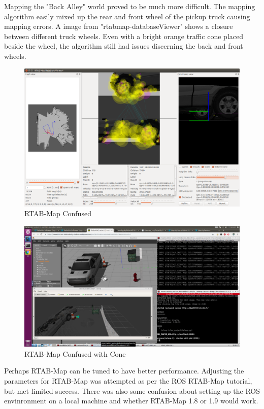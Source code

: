 \documentclass[10pt,journal,compsoc]{IEEEtran}
\begin{document}
Mapping the "Back Alley" world proved to be much more difficult. The mapping algorithm easily mixed up the rear and front wheel of the pickup truck causing mapping errors. A image from "rtabmap-databaseViewer" shows a closure between different truck wheels. Even with a bright orange traffic cone placed beside the wheel, the algorithm still had issues discerning the back and front wheels.

\begin{figure}
    \centering
    \includegraphics[width=\linewidth]{confused_cone_viewer}
    \caption{RTAB-Map Confused}
    \label{fig:confused}
\end{figure}

\begin{figure}
    \centering
    \includegraphics[width=\linewidth]{confused_cone}
    \caption{RTAB-Map Confused with Cone}
    \label{fig:confused_cone}
\end{figure}

Perhaps RTAB-Map can be tuned to have better performance. Adjusting the parameters for RTAB-Map was attempted as per the ROS RTAB-Map tutorial, but met limited success. There was also some confusion about setting up the ROS envinronment on a local machine and whether RTAB-Map 1.8 or 1.9 would work.
\end{document}
